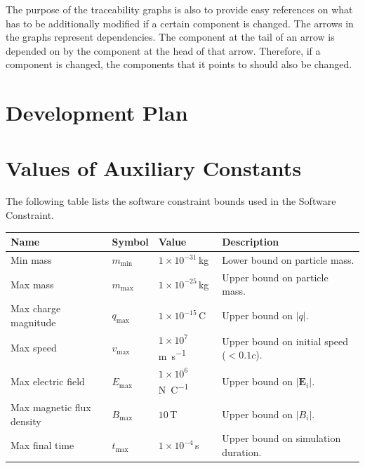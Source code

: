\documentclass[12pt]{article}
\begin{document}
The purpose of the traceability graphs is also to provide easy references on
what has to be additionally modified if a certain component is changed.  The
arrows in the graphs represent dependencies. The component at the tail of an
arrow is depended on by the component at the head of that arrow. Therefore, if a
component is changed, the components that it points to should also be
changed.




\section{Development Plan}

\section{Values of Auxiliary Constants}

The following table lists the software constraint bounds used in the Software Constraint.

\renewcommand{\arraystretch}{1.2}
\noindent \begin{tabular}{l l l p{5.5cm}}
  \toprule
  \textbf{Name} & \textbf{Symbol} & \textbf{Value} & \textbf{Description} \\
  \midrule
  Min mass & $m_{\min}$ & $1\times10^{-31}$\,\si{\kilogram} & Lower bound on particle mass. \\
  Max mass & $m_{\max}$ & $1\times10^{-25}$\,\si{\kilogram} & Upper bound on particle mass. \\
  Max charge magnitude & $q_{\max}$ & $1\times10^{-15}$\,\si{\coulomb} & Upper bound on $|q|$. \\
  Max speed & $v_{\max}$ & $1\times10^{7}$\,\si{\metre\per\second} & Upper bound on initial speed ($< 0.1c$). \\
  Max electric field & $E_{\max}$ & $1\times10^{6}$\,\si{\newton\per\coulomb} & Upper bound on $|\mathbf{E}_i|$. \\
  Max magnetic flux density & $B_{\max}$ & $10$\,\si{\tesla} & Upper bound on $|B_i|$. \\
  Max final time & $t_{\max}$ & $1\times10^{-4}$\,\si{\second} & Upper bound on simulation duration. \\
\end{tabular}
\newpage
\end{document}
